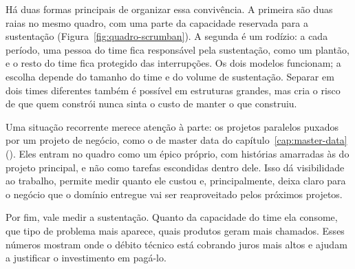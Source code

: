 Há duas formas principais de organizar essa convivência. A primeira são duas raias no mesmo
quadro, com uma parte da capacidade reservada para a sustentação
(Figura~\ref{fig:quadro-scrumban}). A segunda é um rodízio: a cada período, uma pessoa do time
fica responsável pela sustentação, como um plantão, e o resto do time fica protegido das
interrupções. Os dois modelos funcionam; a escolha depende do tamanho do time e do volume de
sustentação. Separar em dois times diferentes também é possível em estruturas grandes, mas cria
o risco de que quem constrói nunca sinta o custo de manter o que construiu.


Uma situação recorrente merece atenção à parte: os projetos paralelos puxados por um projeto de
negócio, como o de master data do capítulo~\ref{cap:master-data}
(). Eles entram no quadro como um épico próprio, com histórias
amarradas às do projeto principal, e não como tarefas escondidas dentro dele. Isso dá
visibilidade ao trabalho, permite medir quanto ele custou e, principalmente, deixa claro para o
negócio que o domínio entregue vai ser reaproveitado pelos próximos projetos.

Por fim, vale medir a sustentação. Quanto da capacidade do time ela consome, que tipo de
problema mais aparece, quais produtos geram mais chamados. Esses números mostram onde o débito
técnico está cobrando juros mais altos e ajudam a justificar o investimento em pagá-lo.


\begin{leituras}
\end{leituras}
